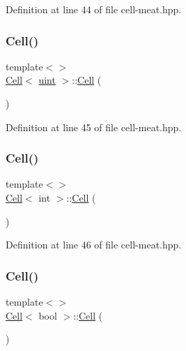 Definition at line 44 of file cell-\/meat.\+hpp.

\mbox{\label{class_cell_aa102374546b7479f50a8eeec80ec2764}} 
\subsubsection{\texorpdfstring{Cell()}{Cell()}\hspace{0.1cm}{\footnotesize\ttfamily [10/12]}}
{\footnotesize\ttfamily template$<$$>$ \\
\hyperlink{class_cell}{Cell}$<$ \hyperlink{typedefs_8hpp_a91ad9478d81a7aaf2593e8d9c3d06a14}{uint} $>$\+::\hyperlink{class_cell}{Cell} (\begin{DoxyParamCaption}{ }\end{DoxyParamCaption})\hspace{0.3cm}{\ttfamily [inline]}}



Definition at line 45 of file cell-\/meat.\+hpp.

\mbox{\label{class_cell_a7019dc2ccc1e14bd17aa9f03b377a199}} 
\subsubsection{\texorpdfstring{Cell()}{Cell()}\hspace{0.1cm}{\footnotesize\ttfamily [11/12]}}
{\footnotesize\ttfamily template$<$$>$ \\
\hyperlink{class_cell}{Cell}$<$ int $>$\+::\hyperlink{class_cell}{Cell} (\begin{DoxyParamCaption}{ }\end{DoxyParamCaption})\hspace{0.3cm}{\ttfamily [inline]}}



Definition at line 46 of file cell-\/meat.\+hpp.

\mbox{\label{class_cell_aef4b64101b33e2349ceea132b962d137}} 
\subsubsection{\texorpdfstring{Cell()}{Cell()}\hspace{0.1cm}{\footnotesize\ttfamily [12/12]}}
{\footnotesize\ttfamily template$<$$>$ \\
\hyperlink{class_cell}{Cell}$<$ bool $>$\+::\hyperlink{class_cell}{Cell} (\begin{DoxyParamCaption}{ }\end{DoxyParamCaption})\hspace{0.3cm}{\ttfamily [inline]}}



